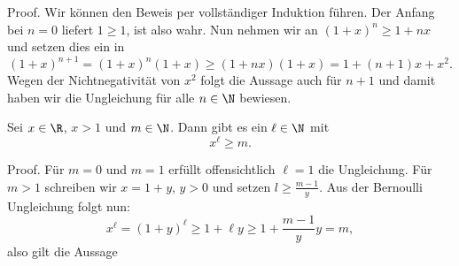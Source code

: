 \documentclass[letterpaper,10pt,english]{jupyterBook}
\begin{document}
\begin{emphBox}{}{}
Proof. Wir können den Beweis per vollständiger Induktion führen. Der Anfang bei \(n=0\) liefert \(1 \geq 1\), ist also wahr. Nun nehmen wir an \((1+x)^n \geq 1 + n x\) und setzen dies ein in
\begin{equation*}
 (1+x)^{n+1} = (1+x)^n (1+x) \geq (1+nx)(1+x) = 1+ (n+1)x +x^2.
\end{equation*}
Wegen der Nichtnegativität von \(x^2\) folgt die Aussage auch für \(n+1\) und damit haben wir die Ungleichung für alle \(n\in \N\) bewiesen.
\end{emphBox}
\label{grundlagen/zahlensysteme:lemma-21}
\begin{lemma}{}{}



Sei \(x \in \R\), \(x  > 1\) und \(m\in \N\). Dann gibt es ein \(\ell \in \N\) mit
\begin{equation*}
x^\ell \geq m.
\end{equation*}\end{lemma}

\begin{emphBox}{}{}
Proof.  Für \(m=0\) und \(m=1\) erfüllt offensichtlich \(\ell=1\) die Ungleichung. Für \(m > 1\) schreiben wir \(x=1+y\), \(y > 0\) und setzen \(l \geq \frac{m-1}y\). Aus der Bernoulli Ungleichung folgt nun:
\begin{equation*}
x^\ell =(1+y)^\ell \geq 1+ \ell y \geq 1+  \frac{m-1}y y = m,
\end{equation*}
also gilt die Aussage
\end{emphBox}
\end{document}
